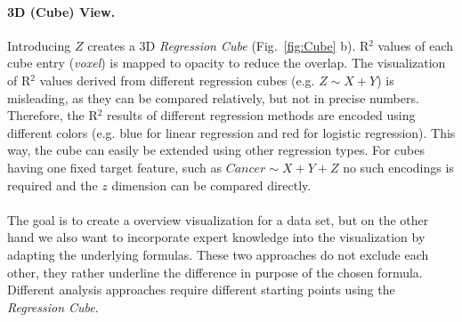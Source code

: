 \documentclass[journal]{style/vgtc} 			          %
\begin{document}
\paragraph{3D (Cube) View.}
Introducing $Z$ creates a 3D \emph{Regression Cube} (Fig.~\ref{fig:Cube} b).
R$^2$ values of each cube entry (\emph{voxel}) is mapped to opacity to reduce the overlap.
The visualization of R$^2$ values derived from different regression cubes (e.g. $Z \sim X + Y$) is misleading, as they can be compared relatively, but not in precise numbers.
Therefore, the R$^2$ results of different regression methods are encoded using different colors (e.g. blue for linear regression and red for logistic regression).
This way, the cube can easily be extended using other regression types.
For cubes having one fixed target feature, such as $Cancer \sim X + Y + Z$ no such encodings is required and the $z$ dimension can be compared directly.
\\\\
The goal is to create a overview visualization for a data set, but on the other hand we also want to incorporate expert knowledge into the visualization by adapting the underlying formulas.
These two approaches do not exclude each other, they rather underline the difference in purpose of the chosen formula.
Different analysis approaches require different starting points using the \emph{Regression Cube}.
\end{document}
